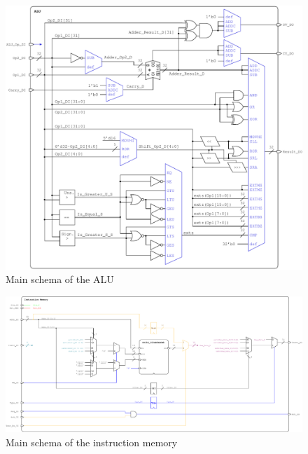 \cleardoublepage
\begin{figure}[t!]

\centering
\includegraphics[scale=0.9]{figures/alu_schema.pdf}
\caption{Main schema of the ALU}
\label{fig:alu_schema}
\end{figure}
\clearpage

\begin{landscape}

\begin{figure}[t!]

%
\includegraphics[scale=0.65]{figures/instr_mem.pdf}
\caption{Main schema of the instruction memory}
\label{fig:instr_mem}

\end{figure}
\end{landscape}
\clearpage
\addtocounter{figure}{1}

\mtcaddchapter



\cleardoublepage

